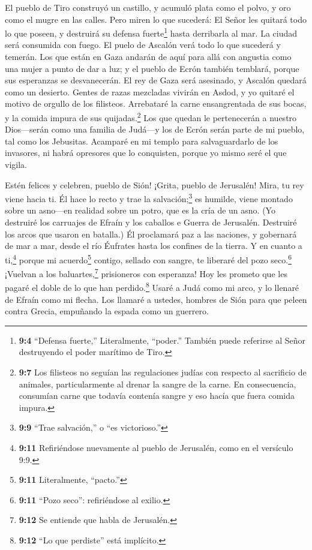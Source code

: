  El pueblo de Tiro construyó un castillo, y acumuló plata
como el polvo, y oro como el mugre en las calles.  Pero
miren lo que sucederá: El Señor les quitará todo lo que poseen, y
destruirá su defensa fuerte\footnote{\textbf{9:4} ``Defensa fuerte,''
  Literalmente, ``poder.'' También puede referirse al Señor destruyendo
  el poder marítimo de Tiro.} hasta derribarla al mar. La ciudad será
consumida con fuego.  El puelo de Ascalón verá todo lo que
sucederá y temerán. Los que están en Gaza andarán de aquí para allá con
angustia como una mujer a punto de dar a luz; y el pueblo de Ecrón
también temblará, porque sus esperanzas se desvanecerán. El rey de Gaza
será asesinado, y Ascalón quedará como un desierto.  Gentes
de razas mezcladas vivirán en Asdod, y yo quitaré el motivo de orgullo
de los filisteos.  Arrebataré la carne ensangrentada de sus
bocas, y la comida impura de sus quijadas.\footnote{\textbf{9:7} Los
  filisteos no seguían las regulaciones judías con respecto al
  sacrificio de animales, particularmente al drenar la sangre de la
  carne. En consecuencia, consumían carne que todavía contenía sangre y
  eso hacía que fuera comida impura.} Los que quedan le pertenecerán a
nuestro Dios---serán como una familia de Judá---y los de Ecrón serán
parte de mi pueblo, tal como los Jebusitas.  Acamparé en mi
templo para salvaguardarlo de los invasores, ni habrá opresores que lo
conquisten, porque yo mismo seré el que vigila.

 Estén felices y celebren, pueblo de Sión! ¡Grita, pueblo de
Jerusalén! Mira, tu rey viene hacia ti. Él hace lo recto y trae la
salvación;\footnote{\textbf{9:9} ``Trae salvación,'' o ``es
  victorioso.''} es humilde, viene montado sobre un asno---en realidad
sobre un potro, que es la cría de un asno.  (Yo destruiré
los carruajes de Efraín y los caballos e Guerra de Jerusalén. Destruiré
los arcos que usaron en batalla.) Él proclamará paz a las naciones, y
gobernará de mar a mar, desde el río Éufrates hasta los confines de la
tierra.  Y en cuanto a ti,\footnote{\textbf{9:11}
  Refiriéndose nuevamente al pueblo de Jerusalén, como en el versículo
  9:9.} porque mi acuerdo\footnote{\textbf{9:11} Literalmente,
  ``pacto.''} contigo, sellado con sangre, te liberaré del pozo
seco.\footnote{\textbf{9:11} ``Pozo seco'': refiriéndose al exilio.}
 ¡Vuelvan a los baluartes,\footnote{\textbf{9:12} Se
  entiende que habla de Jerusalén.} prisioneros con esperanza! Hoy les
prometo que les pagaré el doble de lo que han perdido.\footnote{\textbf{9:12}
  ``Lo que perdiste'' está implícito.}  Usaré a Judá como
mi arco, y lo llenaré de Efraín como mi flecha. Los llamaré a ustedes,
hombres de Sión para que peleen contra Grecia, empuñando la espada como
un guerrero.

